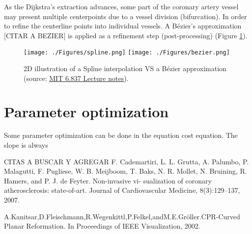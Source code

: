 As the Dijkstra's extraction advances, some part of the coronary artery vessel may present multiple centerpoints due to a vessel division (bifurcation). In order to refine the centerline points into individual vessels. A B\'ezier's approximation [CITAR A BEZIER] is applied as a refinement step (post-processing) (Figure \ref{fig:sp_vs_bz}). 

\begin{figure}[ht]
	\centering
		\texttt{[image: ./Figures/spline.png]}
		\texttt{[image: ./Figures/bezier.png]}
	\caption[Spline interpolation VS B\'ezier approximation]{2D illustration of a Spline interpolation VS a B\'ezier approximation  (source: \href{http://ocw.mit.edu/courses/electrical-engineering-and-computer-science/6-837-computer-graphics-fall-2003/index.htm}{MIT 6.837 Lecture notes}).}
	\label{fig:sp_vs_bz}
\end{figure}


\section{Parameter optimization}

Some parameter optimization can be done in the equation cost equation. The slope is always


CITAS A BUSCAR Y AGREGAR
F. Cademartiri, L. L. Grutta, A. Palumbo, P. Malagutti, F. Pugliese, W. B. Meijboom, T. Baks, N. R. Mollet, N. Bruining, R. Hamers, and P. J. de Feyter. Non-invasive vi- sualization of coronary atherosclerosis: state-of-art. Journal of Cardiovascular Medicine, 8(3):129–137, 2007.

A.Kanitsar,D.Fleischmann,R.Wegenkittl,P.Felkel,andM.E.Gröller.CPR-Curved Planar Reformation. In Proceedings of IEEE Visualization, 2002.
